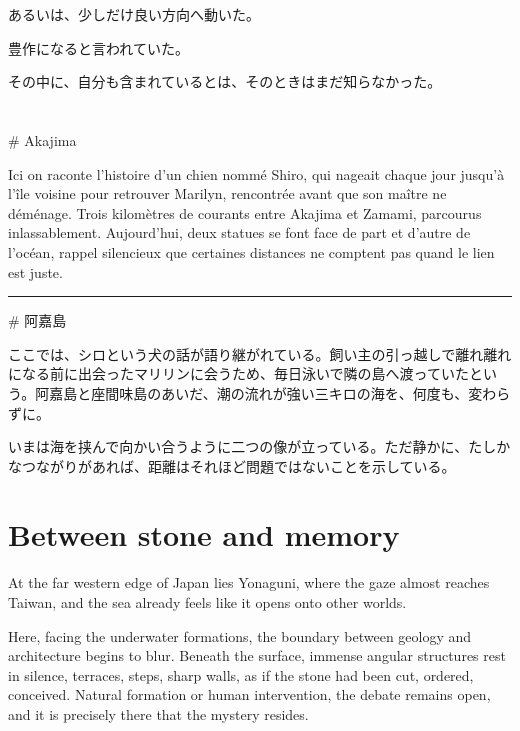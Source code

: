 \documentclass[
  letterpaper,
  oneside]{scrbook}
\begin{document}
あるいは、少しだけ良い方向へ動いた。

豊作になると言われていた。

その中に、自分も含まれているとは、そのときはまだ知らなかった。


\chapter{}\label{section-5}

\# Akajima

Ici on raconte l'histoire d'un chien nommé Shiro, qui nageait chaque
jour jusqu'à l'île voisine pour retrouver Marilyn, rencontrée avant que
son maître ne déménage. Trois kilomètres de courants entre Akajima et
Zamami, parcourus inlassablement. Aujourd'hui, deux statues se font face
de part et d'autre de l'océan, rappel silencieux que certaines distances
ne comptent pas quand le lien est juste.

\begin{center}\rule{0.5\linewidth}{0.5pt}\end{center}

\# 阿嘉島

ここでは、シロという犬の話が語り継がれている。飼い主の引っ越しで離れ離れになる前に出会ったマリリンに会うため、毎日泳いで隣の島へ渡っていたという。阿嘉島と座間味島のあいだ、潮の流れが強い三キロの海を、何度も、変わらずに。

いまは海を挟んで向かい合うように二つの像が立っている。ただ静かに、たしかなつながりがあれば、距離はそれほど問題ではないことを示している。


\chapter{Between stone and memory}\label{between-stone-and-memory}

At the far western edge of Japan lies Yonaguni, where the gaze almost
reaches Taiwan, and the sea already feels like it opens onto other
worlds.

Here, facing the underwater formations, the boundary between geology and
architecture begins to blur. Beneath the surface, immense angular
structures rest in silence, terraces, steps, sharp walls, as if the
stone had been cut, ordered, conceived. Natural formation or human
intervention, the debate remains open, and it is precisely there that
the mystery resides.
\end{document}
